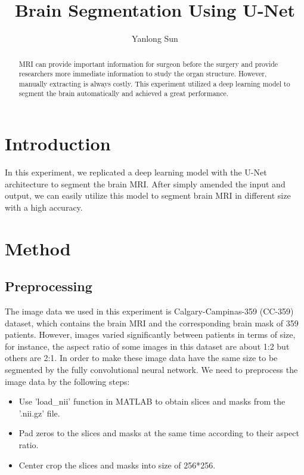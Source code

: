 \documentclass[12pt]{article}
\author{Yanlong Sun}
\title{Brain Segmentation Using U-Net}
\begin{document}
\maketitle

\begin{abstract}
MRI can provide important information for surgeon before the surgery and provide researchers more immediate information to study the organ structure. However, manually extracting is always costly. This experiment utilized a deep learning model to segment the brain automatically and achieved a great performance.
\end{abstract}


\section{Introduction}
In this experiment, we replicated a deep learning model with the U-Net architecture \cite{buda} to segment the brain MRI. After simply amended the input and output, we can easily utilize this model to segment brain MRI in different size with a high accuracy.


\section{Method}

\subsection{Preprocessing}
The image data we used in this experiment is Calgary-Campinas-359 \cite{dataset}(CC-359) dataset, which contains the brain MRI and the corresponding brain mask of 359 patients. However, images varied significantly between patients in terms of size, for instance, the aspect ratio of some images in this dataset are about 1:2 but others are 2:1. In order to make these image data have the same size to be segmented by the fully convolutional neural network. We need to preprocess the image data by the following steps:
\begin{itemize}
	\item Use 'load\_nii' function in MATLAB to obtain slices and masks from the '.nii.gz' file.
	\item Pad zeros to the slices and masks at the same time according to their aspect ratio.
	\item Center crop the slices and masks into size of 256*256.
\end{itemize} 
\end{document}
